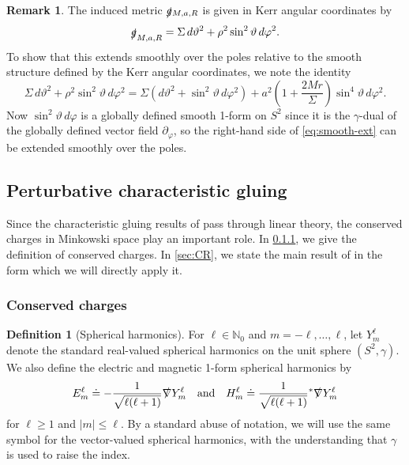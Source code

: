 \documentclass[10pt]{article}
\numberwithin{equation}{section}
\theoremstyle{plain}
\theoremstyle{definition}
\newtheorem{defn}{Definition}[section]
\newtheorem{rk}{Remark}[section]
\renewcommand{\Bbb}{\mathbb}
\begin{document}
    \begin{rk}
      The induced metric  $\slashed g{}_{M,a,R}$ is given in Kerr angular coordinates by 
        \begin{equation}
            \slashed{g}_{M,a,R}= \Sigma\,d\vartheta^2+ \rho^2\sin^2\vartheta \,d\varphi^2.
        \end{equation}
            To show that this extends smoothly over the poles relative to the smooth structure defined by the Kerr angular coordinates, we note the identity 
            \begin{equation}
                \Sigma\,d\vartheta^2+ \rho^2\sin^2\vartheta \,d\varphi^2 = \Sigma(d\vartheta^2+\sin^2\vartheta\,d\varphi^2)+a^2\left(1+\frac{2Mr}{\Sigma}\right)\sin^4\vartheta\,d\varphi^2. \label{eq:smooth-ext}
            \end{equation}
            Now $\sin^2\vartheta\,d\varphi$ is a globally defined smooth 1-form on $S^2$ since it is the $\gamma$-dual of the globally defined vector field $\partial_\varphi$, so the right-hand side of \eqref{eq:smooth-ext} can be extended smoothly over the poles. 
    \end{rk} 
    


\subsection{Perturbative characteristic gluing}

Since the characteristic gluing results of \cite{ACR1,ACR2,ACR3,Czimek2022-cl} pass through linear theory, the conserved charges in Minkowski space play an important role. In \cref{sec:conserved-charges}, we give the definition of conserved charges. In \cref{sec:CR}, we state the main result of \cite{Czimek2022-cl} in the form which we will directly apply it. 

\subsubsection{Conserved charges}
\label{sec:conserved-charges}

\begin{defn}[Spherical harmonics]
    For $\ell\in\Bbb N_{0}$ and $m=-\ell,\dotsc,\ell$, let $Y^\ell_m$ denote the standard real-valued spherical harmonics on the unit sphere $(S^2,\gamma)$. We also define the electric and magnetic 1-form spherical harmonics by 
    \begin{equation*}
        E^\ell_m\doteq  -\frac{1}{\sqrt{\ell(\ell+1)}}\slashed\nabla Y^\ell_m\quad \text{and}\quad H^\ell_m\doteq \frac{1}{\sqrt{\ell(\ell+1)}}{}^*\slashed\nabla Y^\ell_m
    \end{equation*}
    for $\ell\ge 1$ and $|m|\le \ell$. By a standard abuse of notation, we will use the same symbol for the vector-valued spherical harmonics, with the understanding that $\gamma$ is used to raise the index. 
\end{defn}
\end{document}
